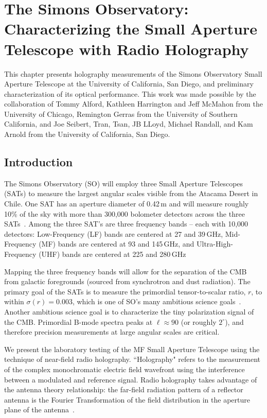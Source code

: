 \chapter{The Simons Observatory: Characterizing the Small Aperture Telescope with Radio Holography}
\label{ch:sat_holo}
This chapter presents holography measurements of the Simons Observatory Small Aperture Telescope at the University of California, San Diego, and preliminary characterization of its optical performance.  This work was made possible by the collaboration of Tommy Alford, Kathleen Harrington and Jeff McMahon from the University of Chicago, Remington Gerras from the University of Southern California, and Joe Seibert, Tran, Tsan, JB LLoyd, Michael Randall, and Kam Arnold from the University of California, San Diego.

\section{Introduction}
The Simons Observatory (SO) will employ three Small Aperture Telescopes (SATs) to measure the largest angular scales visible from the Atacama Desert in Chile.  One SAT has an aperture diameter of 0.42\,m and will measure roughly 10\% of the sky with more than 300,000 bolometer detectors across the three SATs~\cite{2020SPIE11445E7LK}.  Among the three SAT's are three frequency bands -- each with 10,000 detectors: Low-Frequency (LF) bands are centered at 27 and 39\,GHz, Mid-Frequency (MF) bands are centered at 93 and 145\,GHz, and Ultra-High-Frequency (UHF) bands are centered at 225 and 280\,GHz

Mapping the three frequency bands will allow for the separation of the CMB from galactic foregrounds (sourced from synchrotron and dust radiation).  The primary goal of the SATs is to measure the primordial tensor-to-scalar ratio, $r$, to within $\sigma(r) = 0.003$, which is one of SO's many ambitious science goals~\cite{ali20}.  Another ambitious science goal is to characterize the tiny polarization signal of the CMB.  Primordial B-mode spectra peaks at $\ell\approx90$ (or roughly $2^{\circ}$), and therefore precision measurements at large angular scales are critical.

We present the laboratory testing of the MF Small Aperture Telescope using the technique of near-field radio holography.  ``Holography" refers to the measurement of the complex monochromatic electric field wavefront using the interference between a modulated and reference signal.  Radio holography takes advantage of the antenna theory relationship: the far-field radiation pattern of a reflector antenna is the Fourier Transformation of the field distribution in the aperture plane of the antenna~\cite{alma_holog}.

